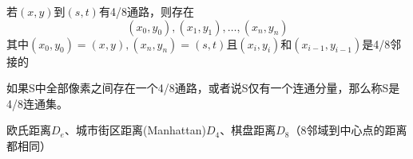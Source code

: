 \begin{definition}[通路]
若$(x,y)$到$(s,t)$有4/8通路，则存在
\[(x_0,y_0),(x_1,y_1),\ldots,(x_n,y_n)\]
其中$(x_0,y_0)=(x,y),(x_n,y_n)=(s,t)$且$(x_i,y_i)$和$(x_{i-1},y_{i-1})$是4/8邻接的
\end{definition}

\begin{definition}[连通集]
如果S中全部像素之间存在一个4/8通路，或者说S仅有一个连通分量，那么称S是4/8连通集。 
\end{definition}

\begin{definition}[距离度量]
欧氏距离$D_e$、城市街区距离(Manhattan)$D_4$、棋盘距离$D_8$（8邻域到中心点的距离都相同）
\end{definition}